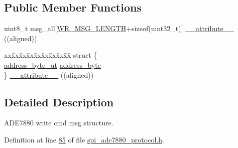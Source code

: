\subsection*{Public Member Functions}
\begin{DoxyCompactItemize}
\item 
uint8\-\_\-t msg\-\_\-all\mbox{[}\hyperlink{a00041_ac85ecf34a5cbd85d6dbd51b4c9a5469e}{W\-R\-\_\-\-M\-S\-G\-\_\-\-L\-E\-N\-G\-T\-H}+sizeof(uint32\-\_\-t)\mbox{]} \hyperlink{a00018_a1649e1bd9e3b85107dbd32225b489e11}{\-\_\-\-\_\-attribute\-\_\-\-\_\-} ((aligned))
\item 
\begin{tabbing}
xx\=xx\=xx\=xx\=xx\=xx\=xx\=xx\=xx\=\kill
struct \{\\
\>\hyperlink{a00011}{address\_byte\_ut} \hyperlink{a00018_af6a65bac733ea3e9b1d24b065163d49a}{address\_byte}\\
\} \hyperlink{a00018_a65e876f21fd4cb6d02b9ed264e68331b}{\_\_attribute\_\_} ((aligned))\\

\end{tabbing}\end{DoxyCompactItemize}


\subsection{Detailed Description}
A\-D\-E7880 write cmd msg structure. 

Definition at line \hyperlink{a00041_source_l00085}{85} of file \hyperlink{a00041_source}{spi\-\_\-ade7880\-\_\-protocol.\-h}.



